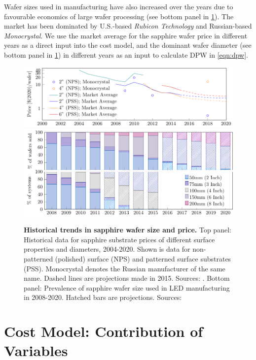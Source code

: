 \documentclass[parskip=full]{article}
\begin{document}
Wafer sizes used in manufacturing have also increased over the years due to favourable economics of large wafer processing (see bottom panel in \cref{fig:wafers}). The market has been dominated by U.S.-based \textit{Rubicon Technology} and Russian-based \textit{Monocrystal}. We use the market average for the sapphire wafer price in different years as a direct input into the cost model, and the dominant wafer diameter (see bottom panel in \cref{fig:wafers}) in different years as an input to calculate DPW in \cref{eqn:dpw}.

\begin{figure}[h!]
    \includegraphics[width=15cm]{./figures/sapphire_prices.pdf}
    \includegraphics[width=14.5cm]{./figures/wafer_size.pdf}
	\caption{\textbf{Historical trends in sapphire wafer size and price.} Top panel: Historical data for sapphire substrate prices of different surface properties and diameters, 2004-2020. Shown is data for non-patterned (polished) surface (NPS) and patterned surface substrates (PSS). Monocrystal denotes the Russian manufacturer of the same name. Dashed lines are projections made in 2015. Sources: \cite{monocrystal2020private}\cite{yole2011sapphire}\cite{yole2015sapphire}. Bottom panel: Prevalence of sapphire wafer size used in LED manufacturing in 2008-2020. Hatched bars are projections. Sources: \cite{veeco2013}\cite{Scholand2012}\cite{yole2015sapphire}}
	\label{fig:wafers}
\end{figure}

\section{Cost Model: Contribution of Variables}
\label{sec:contribution_variables}
\end{document}
